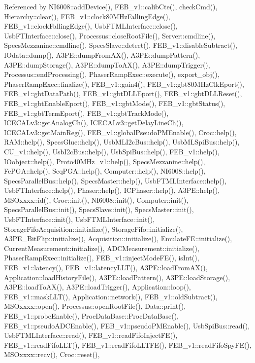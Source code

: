 Referenced by N\+I6008\+::add\+Device(), F\+E\+B\+\_\+v1\+::calib\+Cte(), check\+Cmd(), Hierarchy\+::clear(), F\+E\+B\+\_\+v1\+::clock80\+M\+Hz\+Falling\+Edge(), F\+E\+B\+\_\+v1\+::clock\+Falling\+Edge(), Usb\+F\+T\+M\+L\+Interface\+::close(), Usb\+F\+T\+Interface\+::close(), Processus\+::close\+Root\+File(), Server\+::cmdline(), Specs\+Mezzanine\+::cmdline(), Specs\+Slave\+::detect(), F\+E\+B\+\_\+v1\+::disable\+Subtract(), I\+Odata\+::dump(), A3\+P\+E\+::dump\+From\+A\+X(), A3\+P\+E\+::dump\+Pattern(), A3\+P\+E\+::dump\+Storage(), A3\+P\+E\+::dump\+To\+A\+X(), A3\+P\+E\+::dump\+Trigger(), Processus\+::end\+Processing(), Phaser\+Ramp\+Exec\+::execute(), export\+\_\+obj(), Phaser\+Ramp\+Exec\+::finalize(), F\+E\+B\+\_\+v1\+::gain4(), F\+E\+B\+\_\+v1\+::gbt80\+M\+Hz\+Clk\+Eport(), F\+E\+B\+\_\+v1\+::gbt\+Data\+Path(), F\+E\+B\+\_\+v1\+::gbt\+D\+L\+L\+Eport(), F\+E\+B\+\_\+v1\+::gbt\+D\+L\+L\+Reset(), F\+E\+B\+\_\+v1\+::gbt\+Enable\+Eport(), F\+E\+B\+\_\+v1\+::gbt\+Mode(), F\+E\+B\+\_\+v1\+::gbt\+Status(), F\+E\+B\+\_\+v1\+::gbt\+Term\+Eport(), F\+E\+B\+\_\+v1\+::gbt\+Track\+Mode(), I\+C\+E\+C\+A\+Lv3\+::get\+Analog\+Ch(), I\+C\+E\+C\+A\+Lv3\+::get\+Delay\+Line\+Ch(), I\+C\+E\+C\+A\+Lv3\+::get\+Main\+Reg(), F\+E\+B\+\_\+v1\+::global\+Pseudo\+P\+M\+Enable(), Croc\+::help(), R\+A\+M\+::help(), Specs\+Glue\+::help(), Usb\+M\+L\+I2c\+Bus\+::help(), Usb\+M\+L\+Spi\+Bus\+::help(), C\+U\+\_\+v1\+::help(), Usb\+I2c\+Bus\+::help(), Usb\+Spi\+Bus\+::help(), F\+E\+B\+\_\+v1\+::help(), I\+Oobject\+::help(), Proto40\+M\+Hz\+\_\+v1\+::help(), Specs\+Mezzanine\+::help(), Fe\+P\+G\+A\+::help(), Seq\+P\+G\+A\+::help(), Computer\+::help(), N\+I6008\+::help(), Specs\+Parallel\+Bus\+::help(), Specs\+Master\+::help(), Usb\+F\+T\+M\+L\+Interface\+::help(), Usb\+F\+T\+Interface\+::help(), Phaser\+::help(), I\+C\+Phaser\+::help(), A3\+P\+E\+::help(), M\+S\+Oxxxx\+::id(), Croc\+::init(), N\+I6008\+::init(), Computer\+::init(), Specs\+Parallel\+Bus\+::init(), Specs\+Slave\+::init(), Specs\+Master\+::init(), Usb\+F\+T\+Interface\+::init(), Usb\+F\+T\+M\+L\+Interface\+::init(), Storage\+Fifo\+Acquisition\+::initialize(), Storage\+Fifo\+::initialize(), A3\+P\+E\+\_\+\+Bit\+Flip\+::initialize(), Acquisition\+::initialize(), Emulate\+F\+E\+::initialize(), Current\+Measurement\+::initialize(), A\+D\+C\+Measurement\+::initialize(), Phaser\+Ramp\+Exec\+::initialize(), F\+E\+B\+\_\+v1\+::inject\+Mode\+F\+E(), is\+Int(), F\+E\+B\+\_\+v1\+::latency(), F\+E\+B\+\_\+v1\+::latency\+L\+L\+T(), A3\+P\+E\+::load\+From\+A\+X(), Application\+::load\+History\+File(), A3\+P\+E\+::load\+Pattern(), A3\+P\+E\+::load\+Storage(), A3\+P\+E\+::load\+To\+A\+X(), A3\+P\+E\+::load\+Trigger(), Application\+::loop(), F\+E\+B\+\_\+v1\+::mask\+L\+L\+T(), Application\+::network(), F\+E\+B\+\_\+v1\+::old\+Subtract(), M\+S\+Oxxxx\+::open(), Processus\+::open\+Root\+File(), Data\+::print(), F\+E\+B\+\_\+v1\+::probe\+Enable(), Proc\+Data\+Base\+::\+Proc\+Data\+Base(), F\+E\+B\+\_\+v1\+::pseudo\+A\+D\+C\+Enable(), F\+E\+B\+\_\+v1\+::pseudo\+P\+M\+Enable(), Usb\+Spi\+Bus\+::read(), Usb\+F\+T\+M\+L\+Interface\+::read(), F\+E\+B\+\_\+v1\+::read\+Fifo\+Inject\+F\+E(), F\+E\+B\+\_\+v1\+::read\+Fifo\+L\+L\+T(), F\+E\+B\+\_\+v1\+::read\+Fifo\+L\+L\+T\+F\+E(), F\+E\+B\+\_\+v1\+::read\+Fifo\+Spy\+F\+E(), M\+S\+Oxxxx\+::recv(), Croc\+::reset(), 